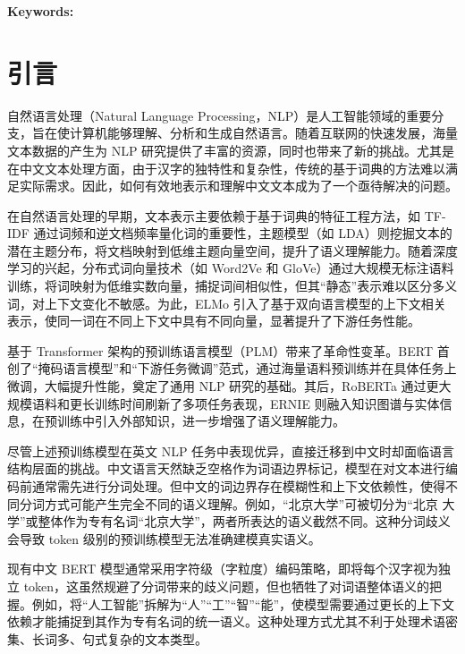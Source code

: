 \documentclass[12pt, a4paper]{ctexart}
\begin{document}
\vspace{2em} %

\textbf{Keywords:} 

\newpage
\tableofcontents %
\newpage


\section{引言}
自然语言处理（Natural Language Processing，NLP）是人工智能领域的重要分支，旨在使计算机能够理解、分析和生成自然语言。随着互联网的快速发展，海量文本数据的产生为 NLP 研究提供了丰富的资源，同时也带来了新的挑战。尤其是在中文文本处理方面，由于汉字的独特性和复杂性，传统的基于词典的方法难以满足实际需求。因此，如何有效地表示和理解中文文本成为了一个亟待解决的问题。

在自然语言处理的早期，文本表示主要依赖于基于词典的特征工程方法，如 TF-IDF 通过词频和逆文档频率量化词的重要性\cite{SALTON1988513}，主题模型（如 LDA）则挖掘文本的潜在主题分布，将文档映射到低维主题向量空间，提升了语义理解能力\cite{10.5555/944919.944937}。随着深度学习的兴起，分布式词向量技术（如 Word2Ve\cite{mikolov2013efficientestimationwordrepresentations} 和 GloVe\cite{pennington-etal-2014-glove}）通过大规模无标注语料训练，将词映射为低维实数向量，捕捉词间相似性，但其“静态”表示难以区分多义词，对上下文变化不敏感。为此，ELMo 引入了基于双向语言模型的上下文相关表示，使同一词在不同上下文中具有不同向量，显著提升了下游任务性能\cite{peters-etal-2018-deep}。

基于 Transformer 架构的预训练语言模型（PLM）带来了革命性变革。BERT 首创了“掩码语言模型”和“下游任务微调”范式，通过海量语料预训练并在具体任务上微调，大幅提升性能，奠定了通用 NLP 研究的基础\cite{devlin-etal-2019-bert}。其后，RoBERTa 通过更大规模语料和更长训练时间刷新了多项任务表现\cite{liu2019robertarobustlyoptimizedbert}，ERNIE 则融入知识图谱与实体信息，在预训练中引入外部知识，进一步增强了语义理解能力\cite{sun2019ernieenhancedrepresentationknowledge}。

尽管上述预训练模型在英文 NLP 任务中表现优异，直接迁移到中文时却面临语言结构层面的挑战。中文语言天然缺乏空格作为词语边界标记，模型在对文本进行编码前通常需先进行分词处理。但中文的词边界存在模糊性和上下文依赖性，使得不同分词方式可能产生完全不同的语义理解。例如，“北京大学”可被切分为“北京 大学”或整体作为专有名词“北京大学”，两者所表达的语义截然不同。这种分词歧义会导致 token 级别的预训练模型无法准确建模真实语义。

现有中文 BERT 模型通常采用字符级（字粒度）编码策略，即将每个汉字视为独立 token，这虽然规避了分词带来的歧义问题，但也牺牲了对词语整体语义的把握。例如，将“人工智能”拆解为“人”“工”“智”“能”，使模型需要通过更长的上下文依赖才能捕捉到其作为专有名词的统一语义。这种处理方式尤其不利于处理术语密集、长词多、句式复杂的文本类型。
\end{document}
